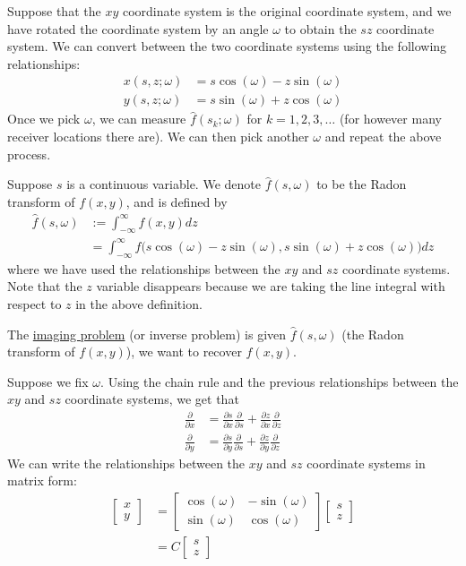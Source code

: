 \documentclass[12pt]{article}
\begin{document}
Suppose that the $xy$ coordinate system is the original coordinate system, and we have rotated the coordinate system by an angle $\omega$ to obtain the $sz$ coordinate system.
We can convert between the two coordinate systems using the following relationships:
\begin{align*}
	x(s, z; \omega) & = s \cos (\omega) - z \sin (\omega) \\
	y(s, z; \omega) & = s \sin(\omega) + z \cos (\omega)
\end{align*}
Once we pick $\omega$, we can measure $\hat{f}(s_{k}; \omega)$ for $k = 1, 2, 3, \hdots$ (for however many receiver locations there are).
We can then pick another $\omega$ and repeat the above process. 
\par 
Suppose $s$ is a continuous variable.
We denote $\hat{f}(s, \omega)$ to be the Radon transform of $f(x, y)$, and is defined by
\begin{align*}
	\hat{f}(s, \omega) & := \int_{-\infty}^{\infty} f(x, y) dz \\
					   & = \int_{-\infty}^{\infty} f\big( s \cos (\omega) - z \sin (\omega), s \sin(\omega) + z \cos (\omega) \big) dz
\end{align*}
where we have used the relationships between the $xy$ and $sz$ coordinate systems.
Note that the $z$ variable disappears because we are taking the line integral with respect to $z$ in the above definition. 
\par 
The \underline{imaging problem} (or inverse problem) is given $\hat{f}(s, \omega)$ (the Radon transform of $f(x, y)$), we want to recover $f(x, y)$.
\par 
Suppose we fix $\omega$.
Using the chain rule and the previous relationships between the $xy$ and $sz$ coordinate systems, we get that
\begin{align*}
	\frac{\partial}{\partial x} & = \frac{\partial s}{\partial x} \frac{\partial}{\partial s} + \frac{\partial z}{\partial x} \frac{\partial}{\partial z} \\
	\frac{\partial}{\partial y} & = \frac{\partial s}{\partial y} \frac{\partial}{\partial s} + \frac{\partial z}{\partial y} \frac{\partial}{\partial z}
\end{align*}
We can write the relationships between the $xy$ and $sz$ coordinate systems in matrix form:
\begin{align*}
	\begin{bmatrix}
		x \\
		y
	\end{bmatrix}
	& = 
	\begin{bmatrix}
		\cos (\omega) & - \sin (\omega) \\
		\sin (\omega) & \cos (\omega)
	\end{bmatrix}
	\begin{bmatrix}
		s \\
		z
	\end{bmatrix} \\
	& = C 
	\begin{bmatrix}
	s \\
	z
	\end{bmatrix}
\end{align*}
\end{document}
